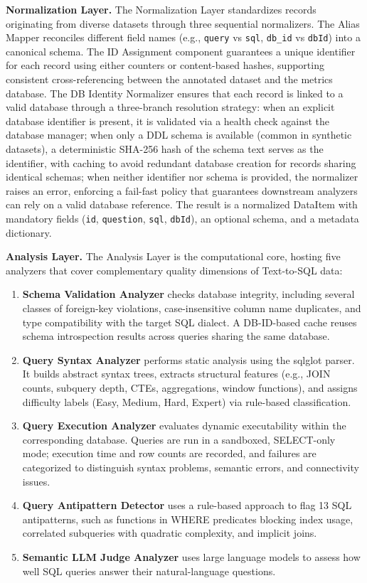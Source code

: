 \documentclass[print]{einformatica}
\begin{document}
\textbf{Normalization Layer.} The Normalization Layer standardizes records originating from diverse datasets through three sequential normalizers. The Alias Mapper reconciles different field names (e.g., \texttt{query} vs \texttt{sql}, \texttt{db\_id} vs \texttt{dbId}) into a canonical schema. The ID Assignment component guarantees a unique identifier for each record using either counters or content-based hashes, supporting consistent cross-referencing between the annotated dataset and the metrics database. The DB Identity Normalizer ensures that each record is linked to a valid database through a three-branch resolution strategy: when an explicit database identifier is present, it is validated via a health check against the database manager; when only a DDL schema is available (common in synthetic datasets), a deterministic SHA-256 hash of the schema text serves as the identifier, with caching to avoid redundant database creation for records sharing identical schemas; when neither identifier nor schema is provided, the normalizer raises an error, enforcing a fail-fast policy that guarantees downstream analyzers can rely on a valid database reference. The result is a normalized DataItem with mandatory fields (\texttt{id}, \texttt{question}, \texttt{sql}, \texttt{dbId}), an optional schema, and a metadata dictionary.

\textbf{Analysis Layer.} The Analysis Layer is the computational core, hosting five analyzers that cover complementary quality dimensions of Text-to-SQL data:

\begin{enumerate}
\item \textbf{Schema Validation Analyzer} checks database integrity, including several classes of foreign-key violations, case-insensitive column name duplicates, and type compatibility with the target SQL dialect. A DB-ID-based cache reuses schema introspection results across queries sharing the same database.

\item \textbf{Query Syntax Analyzer} performs static analysis using the sqlglot parser. It builds abstract syntax trees, extracts structural features (e.g., JOIN counts, subquery depth, CTEs, aggregations, window functions), and assigns difficulty labels (Easy, Medium, Hard, Expert) via rule-based classification.

\item \textbf{Query Execution Analyzer} evaluates dynamic executability within the corresponding database. Queries are run in a sandboxed, SELECT-only mode; execution time and row counts are recorded, and failures are categorized to distinguish syntax problems, semantic errors, and connectivity issues.

\item \textbf{Query Antipattern Detector} uses a rule-based approach to flag 13 SQL antipatterns, such as functions in WHERE predicates blocking index usage, correlated subqueries with quadratic complexity, and implicit joins.

\item \textbf{Semantic LLM Judge Analyzer} uses large language models to assess how well SQL queries answer their natural-language questions. 
\end{enumerate}
\end{document}
